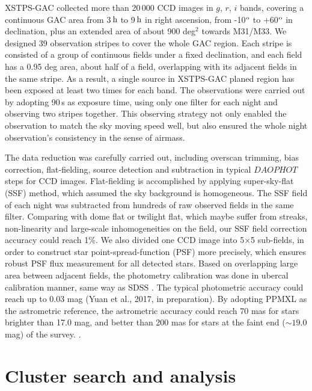 \documentclass[]{raa_rb}
\begin{document}
XSTPS-GAC collected more than 20\,000 CCD images in $g$, $r$, $i$ bands,
covering a continuous GAC area from 3\,$\rm h$ to 9\,$\rm h$ in right ascension,
from -10$^{\rm o}$ to +60$^{\rm o}$ in declination, plus an extended area of
about 900 deg$^2$ towards M31/M33.  We designed 39 observation stripes to cover
the whole GAC region.  Each stripe is consisted of a group of continuous fields under a
fixed declination, and each field has a 0.95 deg area, about half of a field, overlapping with its
adjacent fields in the same stripe. As a result, a single source in XSTPS-GAC planed region
has been exposed at least two times for each band. The observations were carried out by adopting 90\,s as exposure time, using only one filter for each night and observing two stripes together.
This observing strategy not only enabled the observation to match the sky moving speed well, but also ensured the whole night observation's consistency in the sense of airmass.


The data reduction was carefully carried out, including overscan trimming, bias
correction, flat-fielding, source detection and subtraction in typical
$DAOPHOT$\citep{Stetson1987b} steps for CCD images.  Flat-fielding is
accomplished by applying super-sky-flat (SSF) method, which assumed the sky
background is homogeneous. The SSF field of each night was subtracted from
hundreds of raw observed fields in the same filter. Comparing with dome flat
or twilight flat, which maybe suffer from streaks, non-linearity and
large-scale inhomogeneities on the field, our SSF field correction accuracy
could reach 1\%.  We also divided one CCD image into 5$\times$5 sub-fields, in order to
construct star point-spread-function (PSF) more precisely, which ensures robust
PSF flux measurement for all detected stars. Based on overlapping large area
between adjacent fields, the photometry calibration was done in ubercal calibration
manner, same way as SDSS \citep{Padmanabhan:2008}. The typical photometric accuracy could
reach up to 0.03 mag (Yuan et al., 2017, in preparation). By adopting PPMXL as the
astrometric reference, the astrometric accuracy could reach 70 mas for
stars brighter than 17.0 mag, and  better than 200 mas for stars at the faint end ($\sim 19.0$ mag) of
the survey. \citep{Zhang2014}.



\section{Cluster search and analysis}
\end{document}
